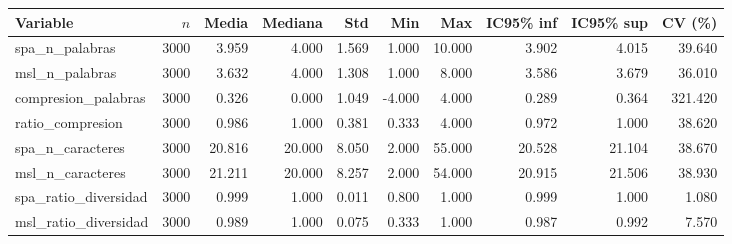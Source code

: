 \begin{tabular}{lrrrrrrrrr}
\toprule
Variable & $n$ & Media & Mediana & Std & Min & Max & IC95\% inf & IC95\% sup & CV (\%) \\
\midrule
spa\_n\_palabras & 3000 & 3.959 & 4.000 & 1.569 & 1.000 & 10.000 & 3.902 & 4.015 & 39.640 \\
msl\_n\_palabras & 3000 & 3.632 & 4.000 & 1.308 & 1.000 & 8.000 & 3.586 & 3.679 & 36.010 \\
compresion\_palabras & 3000 & 0.326 & 0.000 & 1.049 & -4.000 & 4.000 & 0.289 & 0.364 & 321.420 \\
ratio\_compresion & 3000 & 0.986 & 1.000 & 0.381 & 0.333 & 4.000 & 0.972 & 1.000 & 38.620 \\
spa\_n\_caracteres & 3000 & 20.816 & 20.000 & 8.050 & 2.000 & 55.000 & 20.528 & 21.104 & 38.670 \\
msl\_n\_caracteres & 3000 & 21.211 & 20.000 & 8.257 & 2.000 & 54.000 & 20.915 & 21.506 & 38.930 \\
spa\_ratio\_diversidad & 3000 & 0.999 & 1.000 & 0.011 & 0.800 & 1.000 & 0.999 & 1.000 & 1.080 \\
msl\_ratio\_diversidad & 3000 & 0.989 & 1.000 & 0.075 & 0.333 & 1.000 & 0.987 & 0.992 & 7.570 \\
\bottomrule
\end{tabular}
